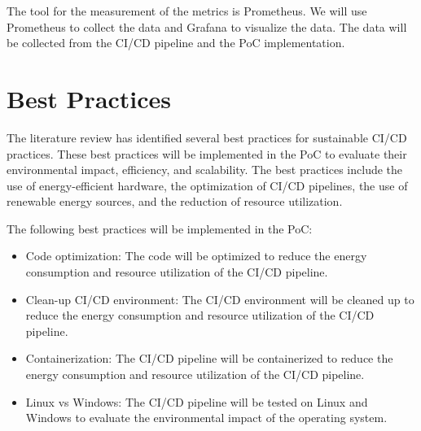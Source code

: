 The tool for the measurement of the metrics is Prometheus. We will use Prometheus to collect the data and Grafana to visualize the data. The data will be collected from the CI/CD pipeline and the PoC implementation. 

\section{Best Practices}%
\label{sec:best-practices}

The literature review has identified several best practices for sustainable CI/CD practices. These best practices will be implemented in the PoC to evaluate their environmental impact, efficiency, and scalability. The best practices include the use of energy-efficient hardware, the optimization of CI/CD pipelines, the use of renewable energy sources, and the reduction of resource utilization.

The following best practices will be implemented in the PoC:
\begin{itemize}
    \item Code optimization: The code will be optimized to reduce the energy consumption and resource utilization of the CI/CD pipeline.
    \item Clean-up CI/CD environment: The CI/CD environment will be cleaned up to reduce the energy consumption and resource utilization of the CI/CD pipeline.
    \item Containerization: The CI/CD pipeline will be containerized to reduce the energy consumption and resource utilization of the CI/CD pipeline.
    \item Linux vs Windows: The CI/CD pipeline will be tested on Linux and Windows to evaluate the environmental impact of the operating system.
\end{itemize}



